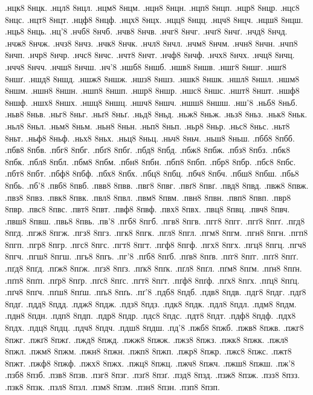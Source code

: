 {.нцк8 8нцк.
.нцл8 8нцл.
.нцм8 8нцм.
.нцн8 8нцн.
.нцп8 8нцп.
.нцр8 8нцр.
.нцс8 8нцс.
.нцт8 8нцт.
.нцф8 8нцф.
.нцх8 8нцх.
.нцц8 8нцц.
.нцч8 8нцч.
.нцш8 8нцш.
.нць8 8нць.
.нц'8
.нчб8 8нчб.
.нчв8 8нчв.
.нчг8 8нчг.
.нчґ8 8нчґ.
.нчд8 8нчд.
.нчж8 8нчж.
.нчз8 8нчз.
.нчк8 8нчк.
.нчл8 8нчл.
.нчм8 8нчм.
.нчн8 8нчн.
.нчп8 8нчп.
.нчр8 8нчр.
.нчс8 8нчс.
.нчт8 8нчт.
.нчф8 8нчф.
.нчх8 8нчх.
.нчц8 8нчц.
.нчч8 8нчч.
.нчш8 8нчш.
.нч'8
.ншб8 8ншб.
.ншв8 8ншв.
.ншг8 8ншг.
.ншґ8 8ншґ.
.ншд8 8ншд.
.ншж8 8ншж.
.ншз8 8ншз.
.ншк8 8ншк.
.ншл8 8ншл.
.ншм8 8ншм.
.ншн8 8ншн.
.ншп8 8ншп.
.ншр8 8ншр.
.ншс8 8ншс.
.ншт8 8ншт.
.ншф8 8ншф.
.ншх8 8ншх.
.ншц8 8ншц.
.ншч8 8ншч.
.ншш8 8ншш.
.нш'8
.ньб8 8ньб.
.ньв8 8ньв.
.ньг8 8ньг.
.ньґ8 8ньґ.
.ньд8 8ньд.
.ньж8 8ньж.
.ньз8 8ньз.
.ньк8 8ньк.
.ньл8 8ньл.
.ньм8 8ньм.
.ньн8 8ньн.
.ньп8 8ньп.
.ньр8 8ньр.
.ньс8 8ньс.
.ньт8 8ньт.
.ньф8 8ньф.
.ньх8 8ньх.
.ньц8 8ньц.
.ньч8 8ньч.
.ньш8 8ньш.
.пбб8 8пбб.
.пбв8 8пбв.
.пбг8 8пбг.
.пбґ8 8пбґ.
.пбд8 8пбд.
.пбж8 8пбж.
.пбз8 8пбз.
.пбк8 8пбк.
.пбл8 8пбл.
.пбм8 8пбм.
.пбн8 8пбн.
.пбп8 8пбп.
.пбр8 8пбр.
.пбс8 8пбс.
.пбт8 8пбт.
.пбф8 8пбф.
.пбх8 8пбх.
.пбц8 8пбц.
.пбч8 8пбч.
.пбш8 8пбш.
.пбь8 8пбь.
.пб'8
.пвб8 8пвб.
.пвв8 8пвв.
.пвг8 8пвг.
.пвґ8 8пвґ.
.пвд8 8пвд.
.пвж8 8пвж.
.пвз8 8пвз.
.пвк8 8пвк.
.пвл8 8пвл.
.пвм8 8пвм.
.пвн8 8пвн.
.пвп8 8пвп.
.пвр8 8пвр.
.пвс8 8пвс.
.пвт8 8пвт.
.пвф8 8пвф.
.пвх8 8пвх.
.пвц8 8пвц.
.пвч8 8пвч.
.пвш8 8пвш.
.пвь8 8пвь.
.пв'8
.пгб8 8пгб.
.пгв8 8пгв.
.пгг8 8пгг.
.пгґ8 8пгґ.
.пгд8 8пгд.
.пгж8 8пгж.
.пгз8 8пгз.
.пгк8 8пгк.
.пгл8 8пгл.
.пгм8 8пгм.
.пгн8 8пгн.
.пгп8 8пгп.
.пгр8 8пгр.
.пгс8 8пгс.
.пгт8 8пгт.
.пгф8 8пгф.
.пгх8 8пгх.
.пгц8 8пгц.
.пгч8 8пгч.
.пгш8 8пгш.
.пгь8 8пгь.
.пг'8
.пґб8 8пґб.
.пґв8 8пґв.
.пґг8 8пґг.
.пґґ8 8пґґ.
.пґд8 8пґд.
.пґж8 8пґж.
.пґз8 8пґз.
.пґк8 8пґк.
.пґл8 8пґл.
.пґм8 8пґм.
.пґн8 8пґн.
.пґп8 8пґп.
.пґр8 8пґр.
.пґс8 8пґс.
.пґт8 8пґт.
.пґф8 8пґф.
.пґх8 8пґх.
.пґц8 8пґц.
.пґч8 8пґч.
.пґш8 8пґш.
.пґь8 8пґь.
.пґ'8
.пдб8 8пдб.
.пдв8 8пдв.
.пдг8 8пдг.
.пдґ8 8пдґ.
.пдд8 8пдд.
.пдж8 8пдж.
.пдз8 8пдз.
.пдк8 8пдк.
.пдл8 8пдл.
.пдм8 8пдм.
.пдн8 8пдн.
.пдп8 8пдп.
.пдр8 8пдр.
.пдс8 8пдс.
.пдт8 8пдт.
.пдф8 8пдф.
.пдх8 8пдх.
.пдц8 8пдц.
.пдч8 8пдч.
.пдш8 8пдш.
.пд'8
.пжб8 8пжб.
.пжв8 8пжв.
.пжг8 8пжг.
.пжґ8 8пжґ.
.пжд8 8пжд.
.пжж8 8пжж.
.пжз8 8пжз.
.пжк8 8пжк.
.пжл8 8пжл.
.пжм8 8пжм.
.пжн8 8пжн.
.пжп8 8пжп.
.пжр8 8пжр.
.пжс8 8пжс.
.пжт8 8пжт.
.пжф8 8пжф.
.пжх8 8пжх.
.пжц8 8пжц.
.пжч8 8пжч.
.пжш8 8пжш.
.пж'8
.пзб8 8пзб.
.пзв8 8пзв.
.пзг8 8пзг.
.пзґ8 8пзґ.
.пзд8 8пзд.
.пзж8 8пзж.
.пзз8 8пзз.
.пзк8 8пзк.
.пзл8 8пзл.
.пзм8 8пзм.
.пзн8 8пзн.
.пзп8 8пзп.
}
